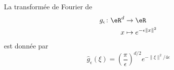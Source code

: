 \begin{lemma}       \label{LEMooPAAJooCsoyAJ}
    La transformée de Fourier de
    \begin{equation}
        \begin{aligned}
            g_{\epsilon}\colon \eR^d&\to \eR \\
            x&\mapsto  e^{-\epsilon\| x \|^2}
        \end{aligned}
    \end{equation}
    est donnée par
    \begin{equation}
        \hat g_{\epsilon}(\xi)=\left( \frac{ \pi }{ \epsilon } \right)^{d/2} e^{-\| \xi \|^2/4\epsilon}
    \end{equation}
\end{lemma}

